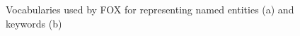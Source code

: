 \documentclass[a4paper,twoside,bibtotoc,abstracton,12pt,BCOR=15mm]{article}
\begin{document}
\begin{figure}[htb]
\centering
{}\qquad
{}
\caption{Vocabularies used by FOX for representing named entities (a) and keywords (b)}
\label{fig:annotation-vocab}
\end{figure}
\end{document}
